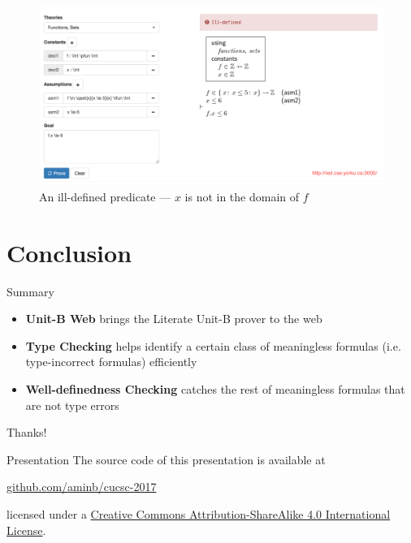 \documentclass[11pt]{beamer}
\newcommand{\unitb}{Unit-B\xspace}
\begin{document}
\begin{frame}[plain]
  \begin{figure}
    \centering
    \includegraphics[width=\textwidth]{img/unitb_wd.png}
    \caption{An ill-defined predicate --- $x$ is not in
                  the domain of $f$}\label{fig:wd}
  \end{figure}
\end{frame}


\section{Conclusion}

\begin{frame}{Summary}

  \begin{itemize}[<+->]
  \item \textbf{\unitb Web} brings the Literate Unit-B prover to the web
  \item \textbf{Type Checking} helps identify a certain class of
    meaningless formulas (i.e. type-incorrect formulas) efficiently
  \item \textbf{Well-definedness Checking} catches the rest of
    meaningless formulas that are not type errors
  \end{itemize}

\end{frame}

\begin{frame}[standout]
  Thanks!
\end{frame}

\appendix

\begin{frame}[fragile]{Presentation}
  The source code of this presentation is available at

  \begin{center}
    \href{https://github.com/aminb/cucsc-2017}{\url{github.com/aminb/cucsc-2017}}
  \end{center}

  licensed under a
  \href{http://creativecommons.org/licenses/by-sa/4.0/}{Creative Commons
  Attribution-ShareAlike 4.0 International License}.

  \begin{center}\ccbysa\end{center}
\end{frame}
\end{document}
